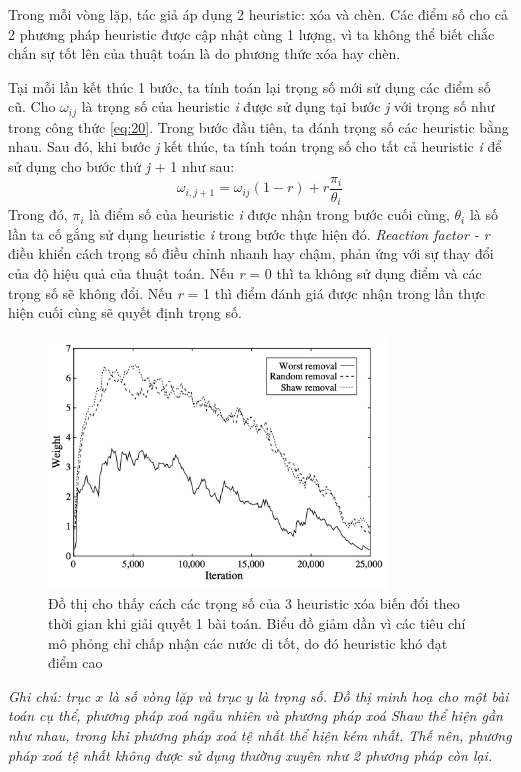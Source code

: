 Trong mỗi vòng lặp, tác giả áp dụng 2 heuristic: xóa và chèn. Các điểm số cho cả 2 phương pháp heuristic được cập nhật cùng 1 lượng, vì ta không thể biết chắc chắn sự tốt lên của thuật toán là do phương thức xóa hay chèn.

Tại mỗi lần kết thúc 1 bước, ta tính toán lại trọng số mới sử dụng các điểm số cũ. Cho $\omega_{ij}$ là trọng số của heuristic \textit{i} được sử dụng tại bước \textit{j} với trọng số như trong công thức \ref{eq:20}. Trong bước đầu tiên, ta đánh trọng số các heuristic bằng nhau. Sau đó, khi bước \textit{j} kết thúc, ta tính toán trọng số cho tất cả heuristic \textit{i} để sử dụng cho bước thứ \textit{j} + 1 như sau:
\begin{equation}
    \omega_{i, j+1} = \omega_{ij}(1-r)+r\frac{\pi_i}{\theta_i}
\end{equation}
Trong đó, $\pi_i$ là điểm số của heuristic \textit{i} được nhận trong bước cuối cùng, $\theta_i$ là số lần ta cố gắng sử dụng heuristic \textit{i} trong bước thực hiện đó. \textit{Reaction factor - r} điều khiển cách trọng số điều chỉnh nhanh hay chậm, phản ứng với sự thay đổi của độ hiệu quả của thuật toán. Nếu \textit{r} = 0 thì ta không sử dụng điểm và các trọng số sẽ không đổi. Nếu \textit{r} = 1 thì điểm đánh giá được nhận trong lần thực hiện cuối cùng sẽ quyết định trọng số.

\begin{figure}[H] %
    \centering %
    \includegraphics[width=0.8\textwidth]{figures/fig-1.png} 
    \caption{Đồ thị cho thấy cách các trọng số của 3 heuristic xóa biến đổi theo thời gian khi giải quyết 1 bài toán. Biểu đồ giảm dần vì các tiêu chí mô phỏng chỉ chấp nhận các nước di tốt, do đó heuristic khó đạt điểm cao} %
    \label{fig:fg_01}
\end{figure}
\textit{Ghi chú: trục $x$ là số vòng lặp và trục $y$ là trọng số. Đồ thị minh hoạ cho một bài toán cụ thể, phương pháp xoá ngẫu nhiên và phương pháp xoá Shaw thể hiện gần như nhau, trong khi phương pháp xoá tệ nhất thể hiện kém nhất. Thế nên, phương pháp xoá tệ nhất không được sử dụng thường xuyên như 2 phương pháp còn lại.}
